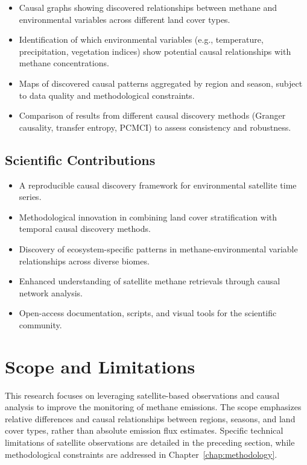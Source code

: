 \begin{itemize}
	\item Causal graphs showing discovered relationships between methane and environmental variables across different land cover types.
	\item Identification of which environmental variables (e.g., temperature, precipitation, vegetation indices) show potential causal relationships with methane concentrations.
	\item Maps of discovered causal patterns aggregated by region and season, subject to data quality and methodological constraints.
	\item Comparison of results from different causal discovery methods (Granger causality, transfer entropy, PCMCI) to assess consistency and robustness.
\end{itemize}

\subsection{Scientific Contributions}

\begin{itemize}
	\item A reproducible causal discovery framework for environmental satellite time series.
	\item Methodological innovation in combining land cover stratification with temporal causal discovery methods.
	\item Discovery of ecosystem-specific patterns in methane-environmental variable relationships across diverse biomes.
	\item Enhanced understanding of satellite methane retrievals through causal network analysis.
	\item Open-access documentation, scripts, and visual tools for the scientific community.
\end{itemize}


\section{Scope and Limitations}

This research focuses on leveraging satellite-based observations and causal analysis to improve the monitoring of methane emissions. The scope emphasizes relative differences and causal relationships between regions, seasons, and land cover types, rather than absolute emission flux estimates. Specific technical limitations of satellite observations are detailed in the preceding section, while methodological constraints are addressed in Chapter~\ref{chap:methodology}.

